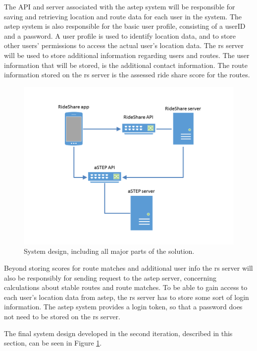 The API and server associated with the \gls{astep} system will be responsible for saving and retrieving location and route data for each user in the system.
The \gls{astep} system is also responsible for the basic user profile, consisting of a userID and a password.
A user profile is used to identify location data, and to store other users' permissions to access the actual user's location data.
The \gls{rs} server will be used to store additional information regarding users and routes.
The user information that will be stored, is the additional contact information.
The route information stored on the \gls{rs} server is the assessed ride share score for the routes. 


\begin{figure}[!h]
	\centering
	\includegraphics[width=\textwidth]{figures/SystemDesign.png}
	\caption{System design, including all major parts of the solution.}
	\label{fig:s2systemdesign}
\end{figure}




Beyond storing scores for route matches and additional user info the \gls{rs} server will also be responsibly for sending request to the \gls{astep} server, concerning calculations about stable routes and route matches.
To be able to gain access to each user's location data from \gls{astep}, the \gls{rs} server has to store some sort of login information.
The \gls{astep} system provides a login token, so that a password does not need to be stored on the \gls{rs} server.


The final system design developed in the second iteration, described in this section, can be seen in Figure \ref{fig:s2systemdesign}.

